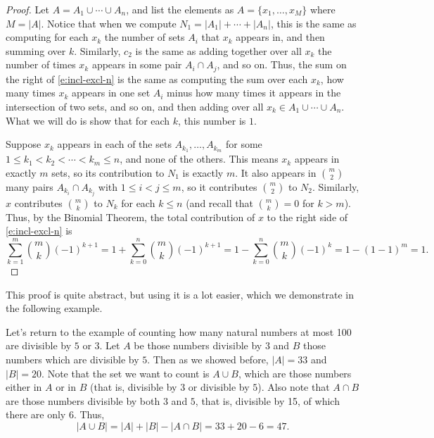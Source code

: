 \documentclass[11pt,dvipsnames]{book}
\numberwithin{figure}{section} %
\numberwithin{table}{section} %
\begin{document}
\begin{proof}
Let $A=A_{1}\cup\cdots \cup A_{n}$, and list the elements as $A=\{x_{1}, \dots ,x_{M}\}$ where $M=|A|$. Notice that when we compute $N_1=|A_{1}|+\cdots + |A_{n}|$, this is the same as computing for each $x_k$ the number of sets $A_i$ that $x_k$ appears in, and then summing over $k$. Similarly, $c_2$ is the same as adding together over all $x_k$ the number of times $x_k$ appears in some pair $A_i\cap A_j$, and so on. Thus, the sum on the right of \eqref{e:incl-excl-n} is the same as computing the sum over each $x_k$,  how many times $x_k$ appears in one set $A_i$ minus how many times it appears in the intersection of two sets, and so on, and then adding over all $x_k\in A_{1}\cup\cdots \cup A_{n}$. What we will do is show that for each $k$, this number is $1$.

Suppose $x_k$ appears in each of the sets $A_{k_{1}}, \dots ,A_{k_{m}}$ for some $1\leq k_1<k_2<\cdots < k_m\leq n$, and none of the others. This means $x_k$ appears in exactly $m$ sets, so its contribution to $N_{1}$ is exactly $m$. It also appears in ${m\choose 2}$ many pairs $A_{k_{i}}\cap A_{k_{j}}$ with $1\leq i<j\leq m$, so it contributes ${m\choose 2}$  to $N_2$. Similarly, $x$ contributes ${m\choose k}$  to $N_k$ for each $k\leq n$ (and recall that ${m\choose k}=0$ for $k>m$). Thus, by the Binomial Theorem, the total contribution of $x$ to the right side of \eqref{e:incl-excl-n} is
\[
\sum_{k=1}^{m} {m\choose k}(-1)^{k+1}
=1 + \sum_{k=0}^{n} {m\choose k}(-1)^{k+1}
=1 -\sum_{k=0}^{n} {m\choose k}(-1)^{k}
=1-(1-1)^{m}=1.
\]

\end{proof}

This proof is quite abstract, but using it is a lot easier, which we demonstrate in the following example.

\begin{example}
Let's return to the example of counting how many natural numbers at most 100 are divisible by $5$ or $3$. Let $A$ be those numbers divisible by $3$ and $B$ those numbers which are divisible by $5$. Then as we showed before, $|A|=33$ and $|B|=20$. Note that the set we want to count is $A\cup B$, which are those numbers either in $A$ or in $B$ (that is, divisible by $3$ or divisible by $5$). Also note that $A\cap B$ are those numbers divisible by both $3$ and $5$, that is, divisible by 15, of which there are only $6$. Thus,
\[
|A\cup B|=|A|+|B|-|A\cap B|=33+20-6 = 47.
\]
\end{example}
\end{document}
